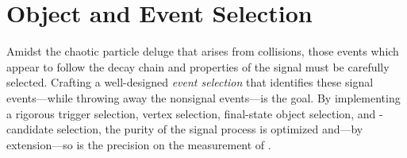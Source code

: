 \section{Object and Event Selection}
\label{sec:evt_sel}
Amidst the chaotic particle deluge that arises from \pp collisions, those events which appear to follow the decay chain and properties of the \hzzfourl signal must be carefully selected.
Crafting a well-designed \emph{event selection} that identifies these signal events---while throwing away the nonsignal events---is the goal.
By implementing a rigorous
trigger selection,
vertex selection,
final-state object selection,
and \ZZ-candidate selection,
the purity of the signal process is optimized and---by extension---so is the precision on the measurement of \mH.

